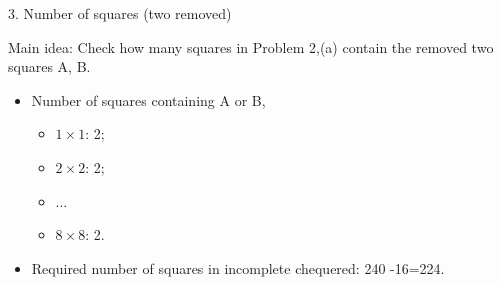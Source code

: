 \documentclass{beamer}
\begin{document}
\begin{frame}{3. Number of squares (two removed)}
  \begin{figure}
  \end{figure}
  Main idea: Check how many squares in Problem 2,(a) contain the removed two squares A, B.
  \begin{itemize}
    \item Number of     squares containing A or B, 
          \begin{itemize}
            \item $1\times 1$: 2;
            \item $2\times 2$: 2;
            \item $\ldots$
            \item $8\times 8$: 2.
          \end{itemize}
    \item Required number of squares in incomplete chequered: 240 -16=224.       
  \end{itemize}

   
\end{frame}
\end{document}
